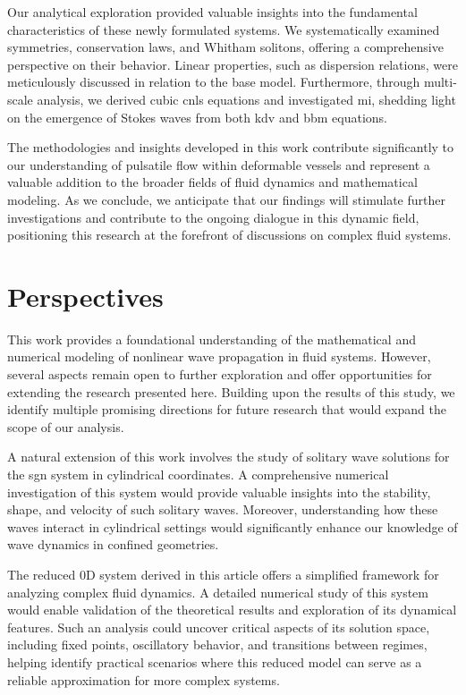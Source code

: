 \documentclass[alpha-refs, 12pt]{wiley-article}
\begin{document}
Our analytical exploration provided valuable insights into the fundamental characteristics of these newly formulated systems. We systematically examined symmetries, conservation laws, and Whitham solitons, offering a comprehensive perspective on their behavior. Linear properties, such as dispersion relations, were meticulously discussed in relation to the base model. Furthermore, through multi-scale analysis, we derived cubic \acrfull{cnls} equations and investigated \acrshort{mi}, shedding light on the emergence of Stokes waves from both \acrshort{kdv} and \acrshort{bbm} equations.

The methodologies and insights developed in this work contribute significantly to our understanding of pulsatile flow within deformable vessels and represent a valuable addition to the broader fields of fluid dynamics and mathematical modeling. As we conclude, we anticipate that our findings will stimulate further investigations and contribute to the ongoing dialogue in this dynamic field, positioning this research at the forefront of discussions on complex fluid systems.

\section{Perspectives}\label{sec:perspectives}

This work provides a foundational understanding of the mathematical and numerical modeling of nonlinear wave propagation in fluid systems. However, several aspects remain open to further exploration and offer opportunities for extending the research presented here. Building upon the results of this study, we identify multiple promising directions for future research that would expand the scope of our analysis.

A natural extension of this work involves the study of solitary wave solutions for the \acrfull{sgn} system in cylindrical coordinates. A comprehensive numerical investigation of this system would provide valuable insights into the stability, shape, and velocity of such solitary waves. Moreover, understanding how these waves interact in cylindrical settings would significantly enhance our knowledge of wave dynamics in confined geometries.

The reduced 0D system derived in this article offers a simplified framework for analyzing complex fluid dynamics. A detailed numerical study of this system would enable validation of the theoretical results and exploration of its dynamical features. Such an analysis could uncover critical aspects of its solution space, including fixed points, oscillatory behavior, and transitions between regimes, helping identify practical scenarios where this reduced model can serve as a reliable approximation for more complex systems.
\end{document}
